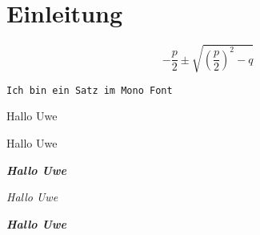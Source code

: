 \documentclass[parskip=half,fontsize=12pt,ngerman]{scrartcl}
\begin{document}
\section{Einleitung}

\blindtext[3]

\[
- \frac{p}{2} \pm \sqrt{ \left( \frac{p}{2}\right)^2 -q  }
\]

\texttt{Ich bin ein Satz im Mono Font}

{ Hallo Uwe}

{\comic Hallo Uwe}

{\comic \blindtext[10]}

{\comicb\bfseries\itshape Hallo Uwe}

{\comicb\itshape Hallo Uwe}

{\comicb\bfseries\itshape Hallo Uwe}
\end{document}
